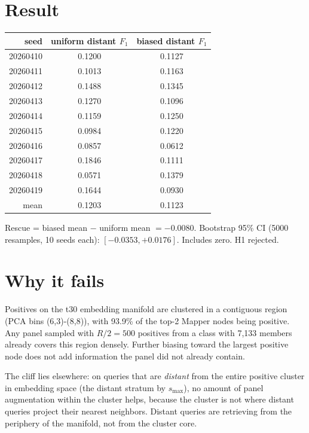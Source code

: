 \documentclass[11pt]{article}
\begin{document}
\section{Result}
\begin{center}
\begin{tabular}{rcc}
\toprule
seed & uniform distant $F_1$ & biased distant $F_1$ \\
\midrule
20260410 & 0.1200 & 0.1127 \\
20260411 & 0.1013 & 0.1163 \\
20260412 & 0.1488 & 0.1345 \\
20260413 & 0.1270 & 0.1096 \\
20260414 & 0.1159 & 0.1250 \\
20260415 & 0.0984 & 0.1220 \\
20260416 & 0.0857 & 0.0612 \\
20260417 & 0.1846 & 0.1111 \\
20260418 & 0.0571 & 0.1379 \\
20260419 & 0.1644 & 0.0930 \\
\midrule
mean     & 0.1203 & 0.1123 \\
\bottomrule
\end{tabular}
\end{center}

Rescue = biased mean $-$ uniform mean $= -0.0080$. Bootstrap 95\% CI (5000 resamples, 10 seeds each): $[-0.0353, +0.0176]$. Includes zero. H1 rejected.

\section{Why it fails}
Positives on the t30 embedding manifold are clustered in a contiguous region (PCA bins (6,3)-(8,8)), with 93.9\% of the top-2 Mapper nodes being positive. Any panel sampled with $R/2{=}500$ positives from a class with 7{,}133 members already covers this region densely. Further biasing toward the largest positive node does not add information the panel did not already contain.

The cliff lies elsewhere: on queries that are \emph{distant} from the entire positive cluster in embedding space (the distant stratum by $s_{\max}$), no amount of panel augmentation within the cluster helps, because the cluster is not where distant queries project their nearest neighbors. Distant queries are retrieving from the periphery of the manifold, not from the cluster core.
\end{document}
